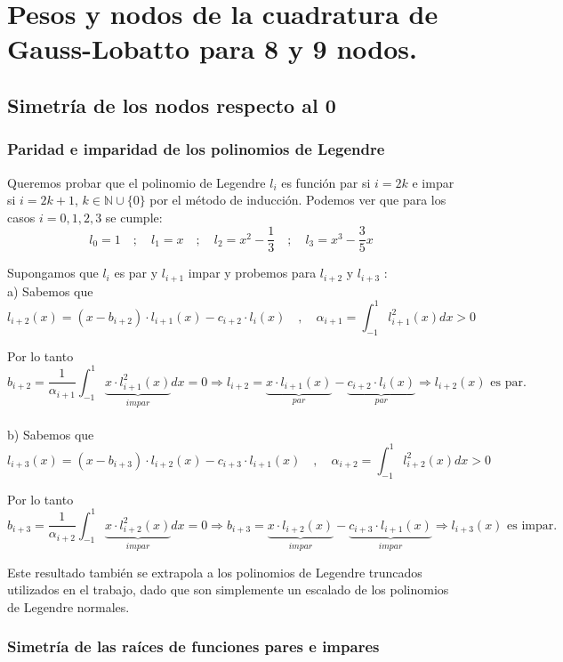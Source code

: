 \documentclass[a4paper]{article}
\begin{document}
\newpage
\section{Pesos y nodos de la cuadratura de Gauss-Lobatto para 8 y 9 nodos.}

\subsection{Simetría de los nodos respecto al 0}

\subsubsection{Paridad e imparidad de los polinomios de Legendre}

Queremos probar que el polinomio de Legendre $l_i$ es función par si $i=2k$ e impar si $i=2k+1$, $k\in\mathbb{N}\cup\{0\}$ por el método de inducción. Podemos ver que para los casos $i=0, 1, 2, 3$ se cumple:
\[l_0=1\quad;\quad l_1=x\quad;\quad l_2=x^2-\frac{1}{3}\quad;\quad l_3=x^3-\frac{3}{5}x \]

Supongamos que $l_i$ es par y $l_{i+1}$ impar y probemos para $l_{i+2}$ y $l_{i+3}$ :\\

a) Sabemos que
\[l_{i+2}(x)=(x-b_{i+2})\cdot l_{i+1}(x)-c_{i+2}\cdot l_i(x)\quad, \quad\alpha_{i+1}=\int_{-1}^1l_{i+1}^2(x)dx>0\]

Por lo tanto\[b_{i+2}=\frac{1}{\alpha_{i+1}} \int_{-1}^1\underbrace{x\cdot l_{i+1}^2(x)}_{impar}dx=0\Rightarrow l_{i+2}=\underbrace{x\cdot l_{i+1}(x)}_{par}-\underbrace{c_{i+2}\cdot l_i(x)}_{par}\Rightarrow l_{i+2}(x)\text{ es par.}\]\\

b) Sabemos que
\[l_{i+3}(x)=(x-b_{i+3})\cdot l_{i+2}(x)-c_{i+3}\cdot l_{i+1}(x)\quad,\quad\alpha_{i+2}=\int_{-1}^1l_{i+2}^2(x)dx>0\] 

Por lo tanto \[b_{i+3}=\frac{1}{\alpha_{i+2}}\int_{-1}^1\underbrace{x\cdot l_{i+2}^2(x)}_{impar}dx=0
\Rightarrow b_{i+3}=\underbrace{x\cdot l_{i+2}(x)}_{impar}-\underbrace{c_{i+3}\cdot l_{i+1}(x)}_{impar}\Rightarrow l_{i+3}(x)\text{ es impar.}\]

Este resultado también se extrapola a los polinomios de Legendre truncados utilizados en el trabajo, dado que son simplemente un escalado de los polinomios de Legendre normales.

\subsubsection{Simetría de las raíces de funciones pares e impares}
\end{document}
